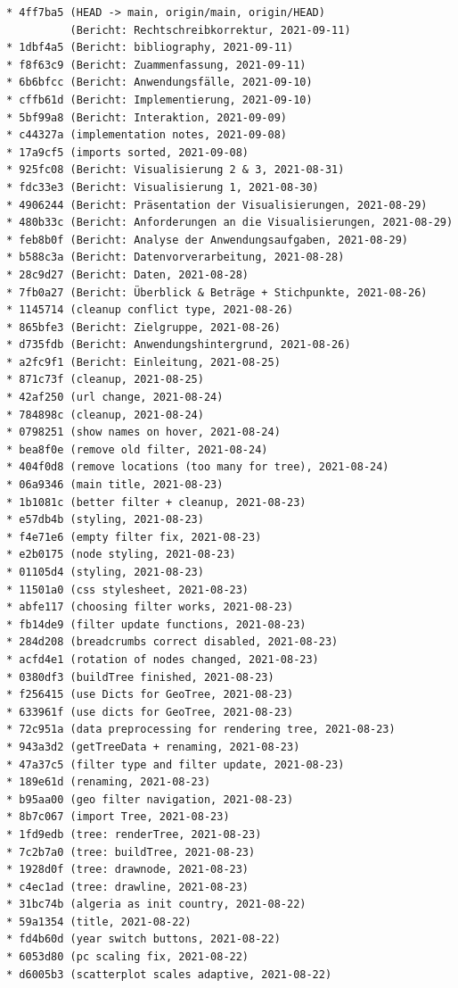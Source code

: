 \documentclass[usegeometry=true]{scrartcl}
\begin{document}
\begin{verbatim}
* 4ff7ba5 (HEAD -> main, origin/main, origin/HEAD)
          (Bericht: Rechtschreibkorrektur, 2021-09-11)
* 1dbf4a5 (Bericht: bibliography, 2021-09-11)
* f8f63c9 (Bericht: Zuammenfassung, 2021-09-11)
* 6b6bfcc (Bericht: Anwendungsfälle, 2021-09-10)
* cffb61d (Bericht: Implementierung, 2021-09-10)
* 5bf99a8 (Bericht: Interaktion, 2021-09-09)
* c44327a (implementation notes, 2021-09-08)
* 17a9cf5 (imports sorted, 2021-09-08)
* 925fc08 (Bericht: Visualisierung 2 & 3, 2021-08-31)
* fdc33e3 (Bericht: Visualisierung 1, 2021-08-30)
* 4906244 (Bericht: Präsentation der Visualisierungen, 2021-08-29)
* 480b33c (Bericht: Anforderungen an die Visualisierungen, 2021-08-29)
* feb8b0f (Bericht: Analyse der Anwendungsaufgaben, 2021-08-29)
* b588c3a (Bericht: Datenvorverarbeitung, 2021-08-28)
* 28c9d27 (Bericht: Daten, 2021-08-28)
* 7fb0a27 (Bericht: Überblick & Beträge + Stichpunkte, 2021-08-26)
* 1145714 (cleanup conflict type, 2021-08-26)
* 865bfe3 (Bericht: Zielgruppe, 2021-08-26)
* d735fdb (Bericht: Anwendungshintergrund, 2021-08-26)
* a2fc9f1 (Bericht: Einleitung, 2021-08-25)
* 871c73f (cleanup, 2021-08-25)
* 42af250 (url change, 2021-08-24)
* 784898c (cleanup, 2021-08-24)
* 0798251 (show names on hover, 2021-08-24)
* bea8f0e (remove old filter, 2021-08-24)
* 404f0d8 (remove locations (too many for tree), 2021-08-24)
* 06a9346 (main title, 2021-08-23)
* 1b1081c (better filter + cleanup, 2021-08-23)
* e57db4b (styling, 2021-08-23)
* f4e71e6 (empty filter fix, 2021-08-23)
* e2b0175 (node styling, 2021-08-23)
* 01105d4 (styling, 2021-08-23)
* 11501a0 (css stylesheet, 2021-08-23)
* abfe117 (choosing filter works, 2021-08-23)
* fb14de9 (filter update functions, 2021-08-23)
* 284d208 (breadcrumbs correct disabled, 2021-08-23)
* acfd4e1 (rotation of nodes changed, 2021-08-23)
* 0380df3 (buildTree finished, 2021-08-23)
* f256415 (use Dicts for GeoTree, 2021-08-23)
* 633961f (use dicts for GeoTree, 2021-08-23)
* 72c951a (data preprocessing for rendering tree, 2021-08-23)
* 943a3d2 (getTreeData + renaming, 2021-08-23)
* 47a37c5 (filter type and filter update, 2021-08-23)
* 189e61d (renaming, 2021-08-23)
* b95aa00 (geo filter navigation, 2021-08-23)
* 8b7c067 (import Tree, 2021-08-23)
* 1fd9edb (tree: renderTree, 2021-08-23)
* 7c2b7a0 (tree: buildTree, 2021-08-23)
* 1928d0f (tree: drawnode, 2021-08-23)
* c4ec1ad (tree: drawline, 2021-08-23)
* 31bc74b (algeria as init country, 2021-08-22)
* 59a1354 (title, 2021-08-22)
* fd4b60d (year switch buttons, 2021-08-22)
* 6053d80 (pc scaling fix, 2021-08-22)
* d6005b3 (scatterplot scales adaptive, 2021-08-22)

\end{verbatim}
\end{document}
